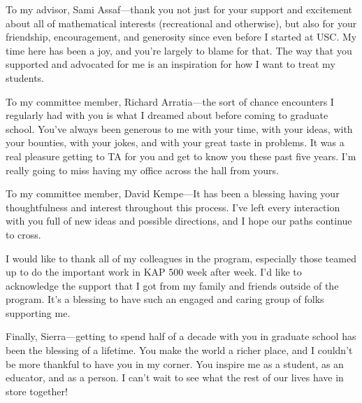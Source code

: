 To my advisor, Sami Assaf---thank you not just for your support and excitement
about all of mathematical interests (recreational and otherwise), but also for your
friendship, encouragement, and generosity since even before I started at USC.
My time here has been a joy, and you're largely to blame for that.
The way that you supported and advocated for me is
an inspiration for how I want to treat my students.

To my committee member, Richard Arratia---the sort of chance encounters I
regularly had with you is what I dreamed about before coming to graduate school.
You've always been generous to me with your time, with your ideas, with your
bounties, with your jokes, and with your great taste in problems.
It was a real pleasure getting to TA for you and get to know you these past five years.
I'm really going to miss having my office across the hall from yours.

To my committee member, David Kempe---It has been a blessing having your
thoughtfulness and interest throughout this process.
I've left every interaction with you full of new ideas and possible directions,
and I hope our paths continue to cross.

I would like to thank all of my colleagues in the program, especially those
teamed up to do the important work in KAP 500 week after week.
I'd like to acknowledge the support that I got from my family and friends
outside of the program. It's a blessing to have such an engaged and caring
group of folks supporting me.

Finally, Sierra---getting to spend half of a decade with you in graduate school
has been the blessing of a lifetime. You make the world a richer place, and I
couldn't be more thankful to have you in my corner.
You inspire me as a student, as an educator, and as a person.
I can't wait to see what the rest of our lives have in store together!
